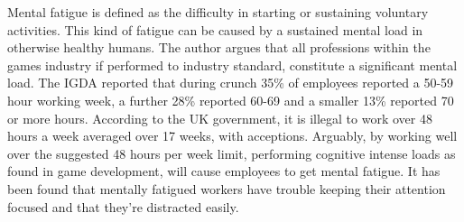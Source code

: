 \documentclass{scrartcl}
\begin{document}
Mental fatigue is defined as the difficulty in starting or sustaining voluntary activities\cite{chaudhuri2004fatigue}. This kind of fatigue can be caused by a sustained mental load in otherwise healthy humans\cite {mizuno2011mental}. The author argues that all professions within the games industry if performed to industry standard, constitute a significant mental load. The IGDA reported that during crunch 35\% of employees reported a 50-59 hour working week, a further 28\% reported 60-69 and a smaller 13\% reported 70 or more hours. According to the UK government, it is illegal to work over 48 hours a week averaged over 17 weeks, with acceptions\cite{maximumweeklyhours}. Arguably, by working well over the suggested 48 hours per week limit, performing cognitive intense loads as found in game development, will cause employees to get mental fatigue. It has been found that mentally fatigued workers have trouble keeping their attention focused and that they're distracted easily\cite{bartlett1943ferrier}.


\end{document}

